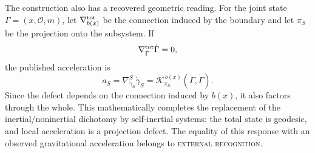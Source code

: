 The construction also has a recovered geometric reading. For the
joint state \(\Gamma=(x,\mathcal O,m)\), let
\(\nabla^{\rm tot}_{b(x)}\) be the connection induced by the boundary and let
\(\pi_S\) be the projection onto the subsystem. If
\[
 \nabla^{\rm tot}_{\dot\Gamma}\dot\Gamma=0,
\]
the published acceleration is
\[
 a_S
 =\nabla^S_{\dot\gamma_S}\dot\gamma_S
 =\mathcal K_{\pi_S}^{\,b(x)}(\dot\Gamma,\dot\Gamma).
\]
Since the defect depends on the connection induced by \(b(x)\), it also
factors through the whole. This mathematically completes the replacement of the
inertial/noninertial dichotomy by self-inertial systems: the total state
is geodesic, and local acceleration is a projection defect. The equality of
this response with an observed gravitational acceleration belongs to
\textsc{external recognition}.

